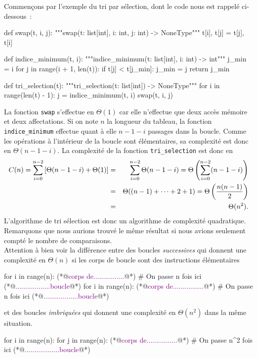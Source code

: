 \documentclass{magnolia}
\begin{document}
Commençons par l'exemple du tri par sélection, dont le code nous est rappelé ci-dessous~:
\begin{pythoncodeline}
def swap(t, i, j):
    """swap(t: list[int], i: int, j: int) -> NoneType"""
    t[i], t[j] = t[j], t[i]

def indice_minimum(t, i):
    """indice_minimum(t: list[int], i: int) -> int"""
    j_min = i
    for j in range(i + 1, len(t)):
        if t[j] < t[j_min]:
            j_min = j
    return j_min

def tri_selection(t):
    """tri_selection(t: list[int]) -> NoneType"""
    for i in range(len(t) - 1):
        j = indice_minimum(t, i)
        swap(t, i, j)
\end{pythoncodeline}
La fonction \verb!swap! s'effectue en $\Theta(1)$ car elle n'effectue que deux accès
mémoire et deux affectations. Si on note $n$ la longueur du tableau, la fonction
\verb!indice_minimum! effectue quant à elle $n-1-i$ passages dans la boucle. Comme
les opérations à l'intérieur de la boucle sont élémentaires, sa complexité est donc
en $\Theta(n-1-i)$. La complexité de la fonction \verb!tri_selection! est donc en
\begin{eqnarray*}
C(n)=\sum_{i=0}^{n-2} \left[\Theta(n-1-i) + \Theta(1)\right]
&=& \sum_{i=0}^{n-2} \Theta(n-1-i) = \Theta\left(\sum_{i=0}^{n-2} (n-1-i)\right)\\
&=& \Theta((n-1)+\cdots+2+1) = \Theta\left(\frac{n(n-1)}{2}\right)\\
&=& \Theta(n^2).
\end{eqnarray*}
L'algorithme de tri sélection est donc un algorithme de complexité quadratique.
Remarquons que nous aurions trouvé le même résultat si nous avions seulement
compté le nombre de comparaisons.\\

Attention à bien voir la différence entre des boucles
  \emph{successives} qui donnent une complexité en $\Theta(n)$ si les corps
  de boucle sont des instructions élémentaires
\begin{pythoncodeline}
for i in range(n):
    (*@\textcolor{purple}{corps de................}@*)  # On passe n fois ici
    (*@\textcolor{purple}{..................boucle}@*)
for i in range(n):
    (*@\textcolor{purple}{corps de................}@*)  # On passe n fois ici
    (*@\textcolor{purple}{..................boucle}@*)
\end{pythoncodeline}
et des boucles \emph{imbriquées} qui donnent une complexité en $\Theta(n^2)$ dans
la même situation.
\begin{pythoncodeline}
for i in range(n):
    for j in range(n):
        (*@\textcolor{purple}{corps de................}@*)  # On passe n^2 fois ici
        (*@\textcolor{purple}{..................boucle}@*)
\end{pythoncodeline}
\end{document}
